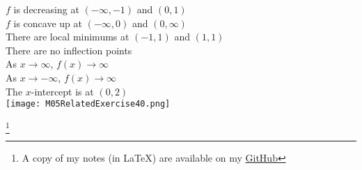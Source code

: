 \documentclass{article}
\newcommand\blfootnote[1]{
    \begingroup
    \renewcommand\thefootnote{}\footnote{#1}
    \addtocounter{footnote}{-1}
    \endgroup
}
\begin{document}
\begin{enumerate}
        $f$ is decreasing at $(-\infty, -1)$ and $(0, 1)$ \\
        $f$ is concave up at $(-\infty, 0)$ and $(0, \infty)$ \\
        There are local minimums at $(-1, 1)$ and $(1, 1)$ \\
        There are no inflection points \\
        As $x \to \infty$, $f(x) \to \infty$ \\
        As $x \to -\infty$, $f(x) \to \infty$ \\
        The $x$-intercept is at $(0, 2)$ \\
        \texttt{[image: M05RelatedExercise40.png]}
\end{enumerate}

\blfootnote{A copy of my notes (in \LaTeX) are available on my \href{https://github.com/onlinechronically/MATH-211}{GitHub}}
\end{document}
